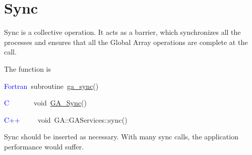 \section{Sync }

Sync is a collective operation. It acts as a barrier, which synchronizes
all the processes and ensures that all the Global Array operations
are complete at the call.

The function is

\textcolor{blue}{Fortran}~subroutine~\href{https://hpc.pnl.gov/globalarrays/api/f_op_api.html\#ga_sync}{ga\_{}sync}()~

\textcolor{blue}{C}~~~~~~~void~\href{https://hpc.pnl.gov/globalarrays/api/c_op_api.html\#ga_sync}{GA\_{}Sync}()~

\textcolor{blue}{C++}~~~~~void~GA::GAServices::sync()

Sync should be inserted as necessary. With many sync calls, the application
performance would suffer. 
